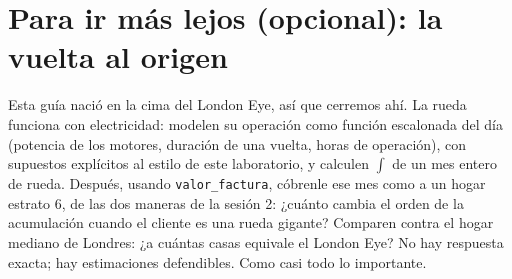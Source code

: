 \documentclass[12pt,letterpaper]{article}
\begin{document}
\section{Para ir más lejos (opcional): la vuelta al origen}
Esta guía nació en la cima del London Eye, así que cerremos ahí. La rueda funciona con electricidad: modelen su operación como función escalonada del día (potencia de los motores, duración de una vuelta, horas de operación), con supuestos explícitos al estilo de este laboratorio, y calculen $\int$ de un mes entero de rueda. Después, usando \texttt{valor\_factura}, cóbrenle ese mes como a un hogar estrato 6, de las dos maneras de la sesión 2: ¿cuánto cambia el orden de la acumulación cuando el cliente es una rueda gigante? Comparen contra el hogar mediano de Londres: ¿a cuántas casas equivale el London Eye? No hay respuesta exacta; hay estimaciones defendibles. Como casi todo lo importante.
\end{document}
